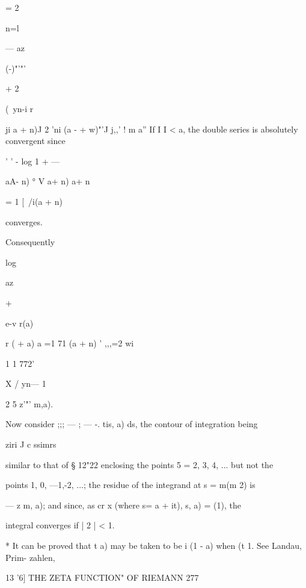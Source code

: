 {{= 2 

n=l 



— az 



  (-)"'"'   



+ 2 



(\ yn-i  r 



ji a + n)J   2 'ni (a - + w)"'J j,,' ! m a'' 
If I   I < a, the double series is absolutely convergent since 



' ' - log   1   +  — 

 aA- n) ° V a+ n) a+ n 



= 1 [\ /i(a + n) 



converges. 

Consequently 



log 



az 



+   



e-v r(a) 

r (  + a) a  =1 71 (a + n) ' ,,,=2 wi 

1 1 772' 



X / yn— 1 

2 5   z'"'  m,a). 



Now consider ;;; — ; — -. tis, a) ds, the contour of integration being 

ziri J c ssimrs   

similar to that of § 12"22 enclosing the points 5 = 2, 3, 4, ... but not the 

points 1, 0, —1,-2, ...; the residue of the integrand at s = m(m 2) is 

—  z  m, a); and since, as cr   x (where s= a + it),   s, a) = (1), the 

integral converges if | 2  | < 1. 

* It can be proved that t  a) may be taken to be i (1 - a) when   (t   1. See Landau, Prim- 
zahlen, %



13 '6] THE ZETA FUNCTION" OF RIEMANN 277 

}}
